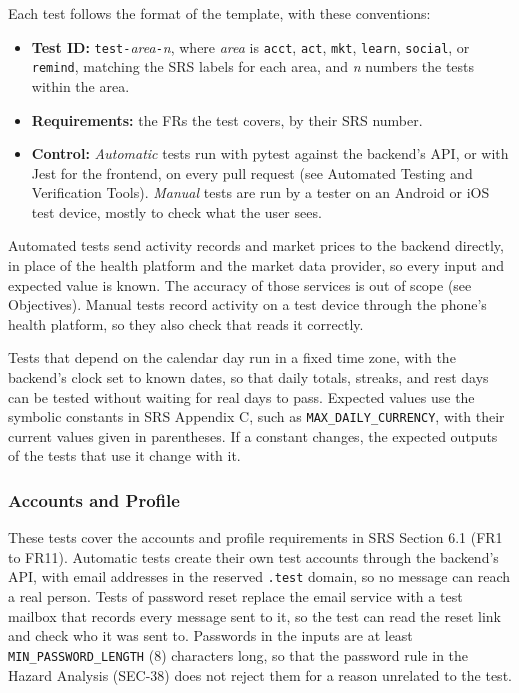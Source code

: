 \documentclass[12pt, titlepage]{article}
\begin{document}
Each test follows the format of the template, with these conventions:

\begin{itemize}
  \item \textbf{Test ID:} \texttt{test-}\textit{area}\texttt{-}\textit{n},
    where \textit{area} is \texttt{acct}, \texttt{act}, \texttt{mkt},
    \texttt{learn}, \texttt{social}, or \texttt{remind}, matching the SRS
    labels for each area, and \textit{n} numbers the tests within the area.
  \item \textbf{Requirements:} the FRs the test covers, by their SRS number.
  \item \textbf{Control:} \textit{Automatic} tests run with pytest against the
    backend's API, or with Jest for the frontend, on every pull request (see
    Automated Testing and Verification Tools). \textit{Manual} tests are run by
    a tester on an Android or iOS test device, mostly to check what the user
    sees.
\end{itemize}

Automated tests send activity records and market prices to the backend
directly, in place of the health platform and the market data provider, so
every input and expected value is known. The accuracy of those services is out
of scope (see Objectives). Manual tests record activity on a test device
through the phone's health platform, so they also check that \progname{} reads
it correctly.

Tests that depend on the calendar day run in a fixed time zone, with the
backend's clock set to known dates, so that daily totals, streaks, and rest
days can be tested without waiting for real days to pass. Expected values use
the symbolic constants in SRS Appendix C, such as
\texttt{MAX\_DAILY\_CURRENCY}, with their current values given in parentheses.
If a constant changes, the expected outputs of the tests that use it change
with it.

\subsubsection{Accounts and Profile}

These tests cover the accounts and profile requirements in SRS Section 6.1
(FR1 to FR11). Automatic tests create their own test accounts through the
backend's API, with email addresses in the reserved \texttt{.test} domain, so
no message can reach a real person. Tests of password reset replace the email
service with a test mailbox that records every message sent to it, so the
test can read the reset link and check who it was sent to. Passwords in the
inputs are at least \texttt{MIN\_PASSWORD\_LENGTH} (8) characters long, so
that the password rule in the Hazard Analysis (SEC-38) does not reject them
for a reason unrelated to the test.
\end{document}
